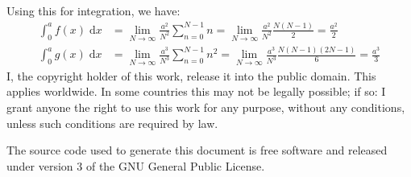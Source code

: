 \documentclass{article}
\theoremstyle{normal}
\begin{document}
    Using this for integration, we have:
    \begin{align}
        \int_{0}^{a}f(x)\;\textrm{d}x
            &=\lim_{N\rightarrow\infty}\frac{a^{2}}{N^{2}}\sum_{n=0}^{N-1}n
            =\lim_{N\rightarrow\infty}\frac{a^{2}}{N^{2}}\frac{N(N-1)}{2}
            =\frac{a^{2}}{2}\\
        \int_{0}^{a}g(x)\;\textrm{d}x
            &=\lim_{N\rightarrow\infty}
            \frac{a^{3}}{N^{3}}\sum_{n=0}^{N-1}n^{2}
            =\lim_{N\rightarrow\infty}\frac{a^{3}}{N^{3}}
                \frac{N(N-1)(2N-1)}{6}
            =\frac{a^{3}}{3}
    \end{align}
    \newpage
    I, the copyright holder of this work, release it into the public domain.
    This applies worldwide. In some countries this may not be legally possible;
    if so: I grant anyone the right to use this work for any purpose, without
    any conditions, unless such conditions are required by law.
    \par\hfill\par
    The source code used to generate this document is free software and released
    under version 3 of the GNU General Public License.
\end{document}
